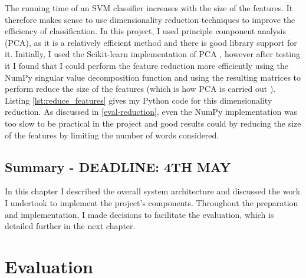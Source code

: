 \documentclass[12pt,a4paper,twoside,openright]{report}
\newcommand{\mylisting}[4]{}
\newcommand{\pylisting}[2]{\mylisting{Python}{py}{#1}{#2}}
\begin{document}
The running time of an SVM classifier increases with the size of the features. It therefore makes sense to use dimensionality reduction techniques to improve the efficiency of classification. In this project, I used principle component analysis (PCA), as it is a relatively efficient method and there is good library support for it. Initially, I used the Scikit-learn implementation of PCA \cite{sklearnpca}, however after testing it I found that I could perform the feature reduction more efficiently using the NumPy singular value decomposition function \cite{numpysvd} and using the resulting matrices to perform reduce the size of the features (which is how PCA is carried out \cite{svd}). Listing \ref{lst:reduce_features} gives my Python code for this dimensionality reduction. As discussed in \ref{eval-reduction}, even the NumPy implementation was too slow to be practical in the project and good results could by reducing the size of the features by limiting the number of words considered.

\pylisting{A function using NumPy array operations to perform singular value decomposition on two sets of given features}{reduce_features}

\section{Summary - DEADLINE: 4TH MAY}

In this chapter I described the overall system architecture and discussed the work I undertook to implement the project's components. Throughout the preparation and implementation, I made decisions to facilitate the evaluation, which is detailed further in the next chapter.

\chapter{Evaluation} \label{eval}

\end{document}
